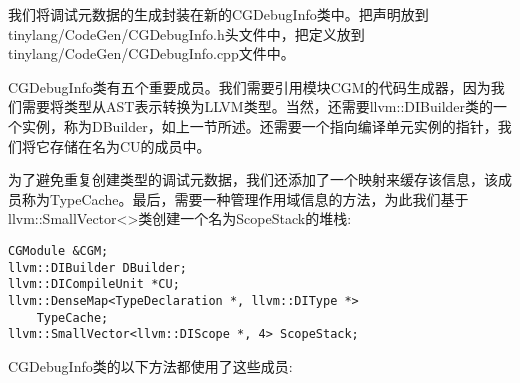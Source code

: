 我们将调试元数据的生成封装在新的CGDebugInfo类中。把声明放到tinylang/CodeGen/CG\allowbreak DebugInfo.h头文件中，把定义放到tinylang/CodeGen/CGDebugInfo.cpp文件中。\par

CGDebugInfo类有五个重要成员。我们需要引用模块CGM的代码生成器，因为我们需要将类型从AST表示转换为LLVM类型。当然，还需要llvm::DIBuilder类的一个实例，称为DBuilder，如上一节所述。还需要一个指向编译单元实例的指针，我们将它存储在名为CU的成员中。\par

为了避免重复创建类型的调试元数据，我们还添加了一个映射来缓存该信息，该成员称为TypeCache。最后，需要一种管理作用域信息的方法，为此我们基于llvm::SmallVector<>类创建一个名为ScopeStack的堆栈:\par

\begin{lstlisting}[caption={}]
CGModule &CGM;
llvm::DIBuilder DBuilder;
llvm::DICompileUnit *CU;
llvm::DenseMap<TypeDeclaration *, llvm::DIType *>
	TypeCache;
llvm::SmallVector<llvm::DIScope *, 4> ScopeStack;
\end{lstlisting}

CGDebugInfo类的以下方法都使用了这些成员:\par

